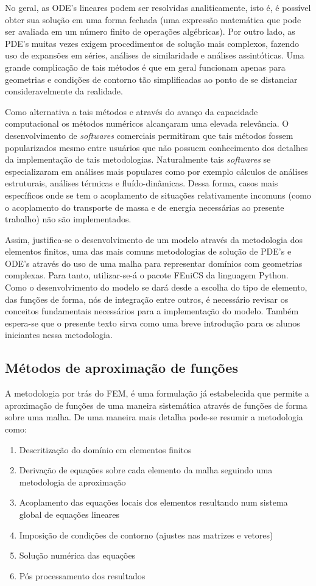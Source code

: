 No geral, as ODE's lineares podem ser resolvidas analiticamente, isto é, é
possível obter sua solução em uma forma fechada (uma expressão matemática que
pode ser avaliada em um número finito de operações algébricas). Por outro lado, as PDE's muitas vezes exigem procedimentos de solução mais complexos, fazendo uso de expansões em séries, análises de similaridade e análises assintóticas. Uma grande
complicação de tais métodos é que em geral funcionam apenas para geometrias e
condições de contorno tão simplificadas ao ponto de se distanciar
consideravelmente da realidade.

Como alternativa a tais métodos e através do avanço da capacidade computacional
os métodos numéricos alcançaram uma elevada relevância. O desenvolvimento de
\textit{softwares} comerciais permitiram que tais métodos fossem popularizados
mesmo entre usuários que não possuem conhecimento dos detalhes da implementação
de tais metodologias. Naturalmente tais \textit{softwares} se especializaram em
análises mais populares como por exemplo cálculos de análises estruturais,
análises térmicas e fluído-dinâmicas. Dessa forma, casos mais específicos onde
se tem o acoplamento de situações relativamente incomuns (como o acoplamento do
transporte de massa e de energia necessárias ao presente trabalho) não são implementados.

Assim, justifica-se o desenvolvimento de um modelo através da metodologia dos elementos finitos, uma das mais comuns metodologias de solução de PDE's e ODE's através do uso de uma malha para representar domínios com geometrias complexas. Para tanto, utilizar-se-á o pacote FEniCS da linguagem Python. Como o desenvolvimento do modelo se dará desde a escolha do tipo de elemento, das funções de forma, nós de integração entre outros, é necessário revisar os conceitos fundamentais necessários para a implementação do modelo. Também espera-se que o presente texto sirva como uma breve introdução para os alunos iniciantes nessa metodologia.

	\subsection{Métodos de aproximação de funções}
	A metodologia por trás do FEM, é uma formulação já estabelecida que permite a
  aproximação de funções de uma maneira sistemática através de funções de forma
  sobre uma malha. De uma maneira mais detalha pode-se resumir a metodologia
  como:
  \begin{enumerate}
  \item Descritização do domínio em elementos finitos
  \item Derivação de equações sobre cada elemento da malha seguindo uma
    metodologia de aproximação
  \item Acoplamento das equações locais dos elementos resultando num sistema
    global de equações lineares
  \item Imposição de condições de contorno (ajustes nas matrizes e vetores)
  \item Solução numérica das equações
  \item Pós processamento dos resultados
  \end{enumerate}

